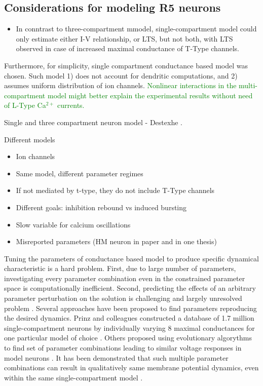 \documentclass[../main.tex]{subfiles}
\begin{document}
\subsection{Considerations for modeling R5 neurons}

\begin{itemize}
    \item In conntrast to three-compartment mmodel, single-compartment model could only estimate either I-V relationship, or LTS, but not both,
    with LTS observed in case of increased maximal conductance of T-Type channels. \parencite{destexheDendriticLowthresholdCalcium1998}
\end{itemize}

Furthermore, for simplicity, single compartment conductance based model was chosen.
Such model 1) does not account for dendritic computations, and 2) assumes uniform distribution of
ion channels. \textcolor{green}{Nonlinear interactions in the multi-compartment model might better explain
the experimental results without need of L-Type Ca$^{2+}$ currents.}

Single and three compartment neuron model - Destexhe \parencite{destexheDendriticLowthresholdCalcium1998}.

Different models
\begin{itemize}
    \item Ion channels
    \item Same model, different parameter regimes
    \item If not mediated by t-type, they do not include T-Type channels
    \item Different goals: inhibition rebound vs induced bursting
    \item Slow variable for calcium oscillations
    \item Misreported parameters (HM neuron in paper and in one thesis)
\end{itemize}

Tuning the parameters of conductance based model to produce specific dynamical characteristic is a hard problem. First, due to large number of parameters, investigating every parameter combination even in the constrained parameter space is computationally inefficient. Second, predicting the effects of an arbitrary parameter perturbation on the solution is challenging and largely unresolved problem \cite{alonsoVisualizationCurrentsNeural2019}. Several approaches have been proposed to find parameters reproducing the desired dynamics. Prinz and colleagues constructed a database of 1.7 million single-compartment neurons by individually varying $8$ maximal conductances for one particular model of choice \parencite{prinzAlternativeHandTuningConductanceBased2003}. Others proposed using evolutionary algorythms to find set of parameter combinations leading to similar voltage responses in model neurons \cite{alonsoVisualizationCurrentsNeural2019}. It has been demonstrated that such multiple parameter combinations can result in qualitatively same membrane potential dynamics, even within the same single-compartment model \cite{alonsoVisualizationCurrentsNeural2019}.
\end{document}
